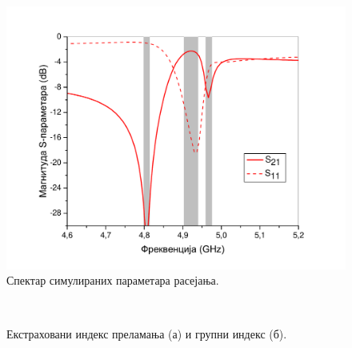 \documentclass[main.tex]{subfiles}
\begin{document}
\begin{figure}[h]
    \centering
    \includegraphics[width=0.8\linewidth]{sl_eit/mag.pdf}
    \caption{Спектар симулираних параметара расејања.}
    \label{fig:sl_eit/mag}
\end{figure}
\begin{figure}[h]
    \centering
    \\
    \caption{Екстраховани индекс преламања (а) и групни индекс (б).}
    \label{fig:indeksi}
\end{figure}
\end{document}

